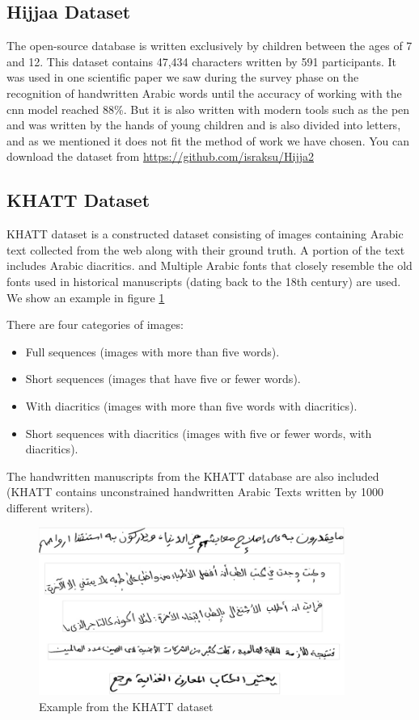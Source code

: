\subsection{Hijjaa Dataset}
The open-source database is written exclusively by children between the ages of 7 and 12. This dataset contains 47,434 characters written by 591 participants. It was used in one scientific paper we saw during the survey phase on the recognition of handwritten Arabic words until the accuracy of working with the \acrshort{cnn} model reached 88\%.\cite{altwaijry2021arabic} But it is also written with modern tools such as the pen and was written by the hands of young children and is also divided into letters, and as we mentioned it does not fit the method of work we have chosen. You can download the dataset from \url{https://github.com/israksu/Hijja2}

\subsection{KHATT Dataset}
KHATT dataset \cite{KHATT} is a constructed dataset consisting of images containing Arabic text collected from the web along with their ground truth.
A portion of the text includes Arabic diacritics. and Multiple Arabic fonts that closely resemble the old fonts used in historical manuscripts (dating back to the 18th century) are used. We show an example in figure \ref{fig:Sample-text-images-from-the-KHATT-dataset}

There are four categories of images:

\begin{itemize}[itemsep=1pt, topsep=5pt]
    \item Full sequences (images with more than five words).
    \item Short sequences (images that have five or fewer words).
    \item With diacritics (images with more than five words with diacritics).
    \item Short sequences with diacritics (images with five or fewer words, with diacritics).
\end{itemize}  

\noindent
The handwritten manuscripts from the KHATT database are also included (KHATT contains unconstrained handwritten Arabic Texts written by 1000 different writers).\cite{mostafa2021ocformer}

\begin{figure}[!htb]
    \centering
    \includegraphics[width=10cm]{images/Sample-text-images-from-the-KHATT-database.PNG}
    \caption{Example from the KHATT dataset}
    \label{fig:Sample-text-images-from-the-KHATT-dataset}
\end{figure}


